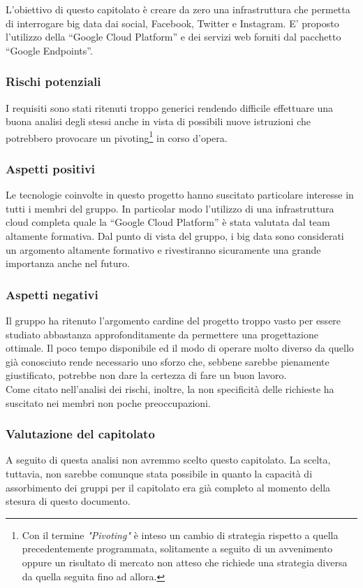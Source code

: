 L'obiettivo di questo capitolato è creare da zero una infrastruttura che permetta di interrogare big data dai social, Facebook, Twitter e Instagram.
E’ proposto l'utilizzo della “Google Cloud Platform” e dei servizi web forniti dal pacchetto “Google Endpoints”. 

\subsubsection{Rischi potenziali}
I requisiti sono stati ritenuti troppo generici  rendendo difficile effettuare una buona analisi degli stessi anche in vista di possibili nuove istruzioni che potrebbero provocare un pivoting\footnote{Con il termine \textit{"Pivoting"} è inteso un cambio di strategia rispetto a quella precedentemente programmata, solitamente a seguito di un avvenimento oppure un risultato di mercato non atteso che richiede una strategia diversa da quella seguita fino ad allora.} in corso d'opera.

\subsubsection{Aspetti positivi}
Le tecnologie coinvolte in questo progetto hanno suscitato particolare interesse in tutti i membri del gruppo. In particolar modo l'utilizzo di una infrastruttura cloud completa quale la “Google Cloud Platform” è stata valutata dal team altamente formativa. Dal punto di vista del gruppo, i big data sono considerati un argomento altamente formativo e rivestiranno sicuramente una grande importanza anche nel futuro.

\subsubsection{Aspetti negativi}
Il gruppo ha ritenuto l'argomento cardine del progetto troppo vasto per essere studiato abbastanza approfonditamente da permettere una progettazione ottimale. Il poco tempo disponibile ed il modo di operare molto diverso da quello già conosciuto rende necessario uno sforzo che, sebbene
sarebbe pienamente giustificato, potrebbe non dare la certezza di fare un buon lavoro.\\
Come citato nell'analisi dei rischi, inoltre, la non specificità delle richieste  ha suscitato nei membri non poche preoccupazioni.


\subsubsection{Valutazione del capitolato} 

A seguito di questa analisi non avremmo scelto questo capitolato. La scelta, tuttavia, non sarebbe comunque stata possibile in quanto la capacità di assorbimento dei gruppi per il capitolato era già completo al momento della stesura di questo documento.

